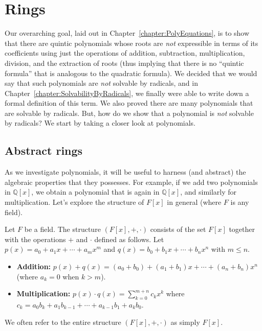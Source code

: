 \chapter{Rings}
\label{chapter:Rings}
\thispagestyle{empty}
Our overarching goal, laid out in Chapter~\ref{chapter:PolyEquations}, is to show that there are quintic polynomials whose roots are \emph{not} expressible in terms of its coefficients using just the operations of addition, subtraction, multiplication, division, and the extraction of roots (thus implying that there is no ``quintic formula'' that is analogous to the quadratic formula). We decided that we would say that such polynomials are \emph{not} solvable by radicals, and in Chapter~\ref{chapter:SolvabilityByRadicals}, we finally were able to write down a formal definition of this term. We also proved there are many polynomials that are solvable by radicals. But, how do we show that a polynomial  is \emph{not} solvable by radicals? We start by taking a closer look at polynomials.


\section{Abstract rings}
As we investigate polynomials, it will be useful to harness (and abstract) the algebraic properties that they possesses. For example, if we add two polynomials in $\mathbb{Q}[x]$, we obtain a polynomial that is again in $\mathbb{Q}[x]$, and similarly for multiplication. Let's explore the structure of $F[x]$ in general (where $F$ is any field). 

\begin{definition}
Let $F$ be a field. The structure $(F[x],+,\cdot)$ consists of the set $F[x]$ together with the operations $+$ and $\cdot$ defined as follows. Let $p(x) = a_0 + a_1x + \cdots + a_mx^m$ and $q(x) = b_0 + b_1x + \cdots + b_nx^n$ with $m\le n$.
\begin{itemize}
\item \textbf{Addition:} $p(x) + q(x) =  (a_0 + b_0) + (a_1 + b_1)x + \cdots + (a_n + b_n)x^n$ (where $a_k = 0$ when $k> m$).
\item \textbf{Multiplication:} $p(x)\cdot q(x) = \displaystyle\sum_{k=0}^{m+n}c_kx^k$ where $c_k = a_0b_k + a_1b_{k-1} + \cdots + a_{k-1}b_1 + a_kb_0$.
\end{itemize}
We often refer to the entire structure $(F[x],+,\cdot)$ as simply $F[x]$.
\end{definition}

